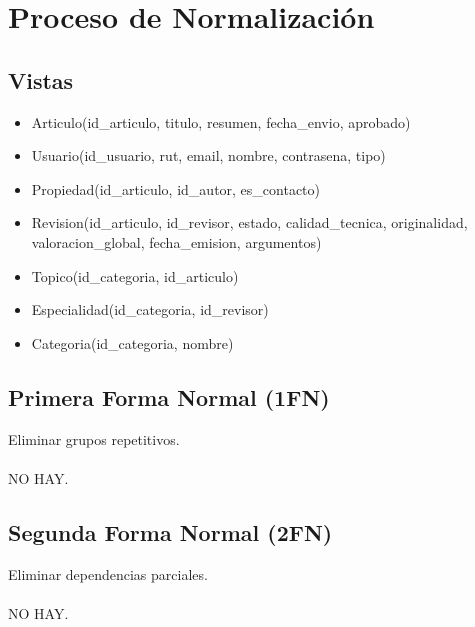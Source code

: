 \documentclass{article}
\begin{document}
\begin{center}
{
}
\end{center}

\section{Proceso de Normalización}
\subsection{Vistas}
\begin{itemize}
    \item Articulo(id\_articulo, titulo, resumen, fecha\_envio, aprobado)
    \item Usuario(id\_usuario, rut, email, nombre, contrasena, tipo)
    \item Propiedad(id\_articulo, id\_autor, es\_contacto)
    \item Revision(id\_articulo, id\_revisor, estado, calidad\_tecnica, originalidad, valoracion\_global, fecha\_emision, argumentos)
    \item Topico(id\_categoria, id\_articulo)
    \item Especialidad(id\_categoria, id\_revisor)
    \item Categoria(id\_categoria, nombre)
\end{itemize}
\subsection{Primera Forma Normal (1FN)}
Eliminar grupos repetitivos.\\\\
NO HAY.

\subsection{Segunda Forma Normal (2FN)}
Eliminar dependencias parciales.\\\\
NO HAY.
\end{document}
